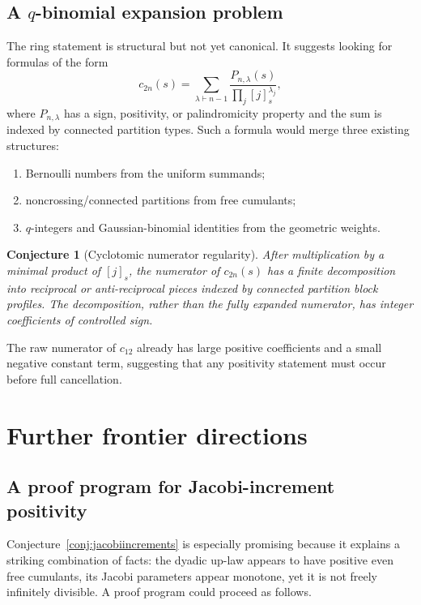 \documentclass[11pt]{article}
\newtheorem{conjecture}[theorem]{Conjecture}
\theoremstyle{definition}
\begin{document}
\subsection{A \texorpdfstring{\(q\)}{q}-binomial expansion problem}
The ring statement is structural but not yet canonical. It suggests looking for formulas of the form
\begin{equation}\label{eq:qbinomialdesired}
c_{2n}(s)=\sum_{\lambda\vdash n-1}
\frac{P_{n,\lambda}(s)}{\prod_j[j]_s^{\lambda_j}},
\end{equation}
where \(P_{n,\lambda}\) has a sign, positivity, or palindromicity property and the sum is indexed by connected partition types. Such a formula would merge three existing structures:
\begin{enumerate}[label=(\roman*)]
\item Bernoulli numbers from the uniform summands;
\item noncrossing/connected partitions from free cumulants;
\item \(q\)-integers and Gaussian-binomial identities from the geometric weights.
\end{enumerate}

\begin{conjecture}[Cyclotomic numerator regularity]\label{conj:cyclotomicnumerator}
After multiplication by a minimal product of \([j]_s\), the numerator of \(c_{2n}(s)\) has a finite decomposition into reciprocal or anti-reciprocal pieces indexed by connected partition block profiles. The decomposition, rather than the fully expanded numerator, has integer coefficients of controlled sign.
\end{conjecture}
The raw numerator of \(c_{12}\) already has large positive coefficients and a small negative constant term, suggesting that any positivity statement must occur before full cancellation.

\section{Further frontier directions}
\subsection{A proof program for Jacobi-increment positivity}
Conjecture~\ref{conj:jacobiincrements} is especially promising because it explains a striking combination of facts: the dyadic up-law appears to have positive even free cumulants, its Jacobi parameters appear monotone, yet it is not freely infinitely divisible. A proof program could proceed as follows.
\end{document}
